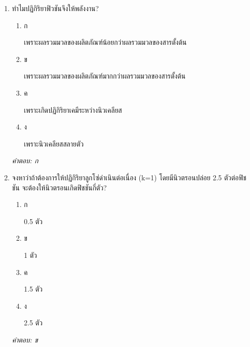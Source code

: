 \documentclass[12pt]{article}
\begin{document}
\begin{enumerate}[label=\arabic*., itemsep=0.5\baselineskip, topsep=0.5\baselineskip, leftmargin=*]
\item ทำไมปฏิกิริยาฟิวชันจึงให้พลังงาน?
\begin{enumerate}[label=\alph*)., itemsep=0.3\baselineskip, topsep=0.3\baselineskip]
\item ก\ 
\begin{minipage}[t]{0.9\linewidth}
\raggedright เพราะผลรวมมวลของผลิตภัณฑ์น้อยกว่าผลรวมมวลของสารตั้งต้น
\end{minipage}
\item ข\ 
\begin{minipage}[t]{0.9\linewidth}
\raggedright เพราะผลรวมมวลของผลิตภัณฑ์มากกว่าผลรวมมวลของสารตั้งต้น
\end{minipage}
\item ค\ 
\begin{minipage}[t]{0.9\linewidth}
\raggedright เพราะเกิดปฏิกิริยาเคมีระหว่างนิวเคลียส
\end{minipage}
\item ง\ 
\begin{minipage}[t]{0.9\linewidth}
\raggedright เพราะนิวเคลียสสลายตัว
\end{minipage}
\end{enumerate}
\vspace{-0.3\baselineskip}
\begin{small}
\textit{คำตอบ: ก}
\end{small}

\item จงหาว่าถ้าต้องการให้ปฏิกิริยาลูกโซ่ดำเนินต่อเนื่อง (k=1) โดยมีนิวตรอนปล่อย 2.5 ตัวต่อฟิชชัน จะต้องให้นิวตรอนเกิดฟิชชันกี่ตัว?
\begin{enumerate}[label=\alph*)., itemsep=0.3\baselineskip, topsep=0.3\baselineskip]
\item ก\ 
\begin{minipage}[t]{0.9\linewidth}
\raggedright 0.5 ตัว
\end{minipage}
\item ข\ 
\begin{minipage}[t]{0.9\linewidth}
\raggedright 1 ตัว
\end{minipage}
\item ค\ 
\begin{minipage}[t]{0.9\linewidth}
\raggedright 1.5 ตัว
\end{minipage}
\item ง\ 
\begin{minipage}[t]{0.9\linewidth}
\raggedright 2.5 ตัว
\end{minipage}
\end{enumerate}
\vspace{-0.3\baselineskip}
\begin{small}
\textit{คำตอบ: ข}
\end{small}


\end{enumerate}
\end{document}
